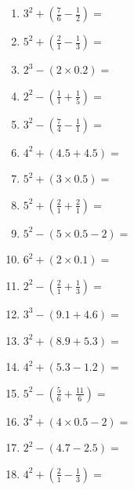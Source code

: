 \documentclass[12pt]{article}
\begin{document}
    \begin{enumerate}
\item \large $ 3^{2} + (\frac{7}{6} - \frac{1}{2}) = $ \vspace{1.4cm}
\item \large $ 5^{2} + (\frac{2}{1} - \frac{1}{3}) = $ \vspace{1.4cm}
\item \large $ 2^{3} - (2 \times 0.2) = $ \vspace{1.4cm}
\item \large $ 2^{2} - (\frac{1}{1} + \frac{1}{5}) = $ \vspace{1.4cm}
\item \large $ 3^{2} - (\frac{7}{4} - \frac{1}{1}) = $ \vspace{1.4cm}
\item \large $ 4^{2} + (4.5 + 4.5) = $ \vspace{1.4cm}
\item \large $ 5^{2} + (3 \times 0.5) = $ \vspace{1.4cm}
\item \large $ 5^{2} + (\frac{2}{1} + \frac{2}{1}) = $ \vspace{1.4cm}
\newpage
\item \large $ 5^{2} - (5 \times 0.5 - 2) = $ \vspace{1.4cm}
\item \large $ 6^{2} + (2 \times 0.1) = $ \vspace{1.4cm}
\item \large $ 2^{2} - (\frac{2}{1} + \frac{1}{3}) = $ \vspace{1.4cm}
\item \large $ 3^{3} - (9.1 + 4.6) = $ \vspace{1.4cm}
\item \large $ 3^{2} + (8.9 + 5.3) = $ \vspace{1.4cm}
\item \large $ 4^{2} + (5.3 - 1.2) = $ \vspace{1.4cm}
\item \large $ 5^{2} - (\frac{5}{6} + \frac{11}{6}) = $ \vspace{1.4cm}
\item \large $ 3^{2} + (4 \times 0.5 - 2) = $ \vspace{1.4cm}
\item \large $ 2^{2} - (4.7 - 2.5) = $ \vspace{1.4cm}
\item \large $ 4^{2} + (\frac{2}{1} - \frac{1}{3}) = $ \vspace{1.4cm}

\end{enumerate}
\end{document}
